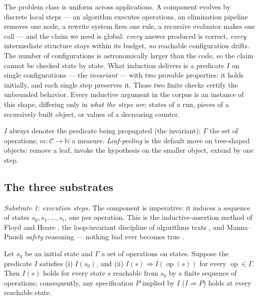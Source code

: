 The problem class is uniform across applications. A component evolves by discrete local
steps --- an algorithm executes operations, an elimination pipeline removes one node, a
rewrite system fires one rule, a recursive evaluator makes one call --- and the claim we
need is global: \emph{every} answer produced is correct, \emph{every} intermediate
structure stays within its budget, \emph{no} reachable configuration drifts. The number
of configurations is astronomically larger than the code, so the claim cannot be
checked state by state. What induction delivers is a predicate $I$ on single
configurations --- the \emph{invariant} --- with two provable properties: it holds
initially, and each single step preserves it. Those two finite checks certify the
unbounded behavior. Every inductive argument in the corpus is an instance of this
shape, differing only in \emph{what the steps are}: states of a run, pieces of a
recursively built object, or values of a decreasing counter.

\begin{remarkbox}[Notation]
$I$ always denotes the predicate being propagated (the invariant); $\Gamma$ the set of
operations; $m\colon\mathcal{C}\to\mathbb{N}$ a measure. \emph{Leaf-peeling} is the
default move on tree-shaped objects: remove a leaf, invoke the hypothesis on the
smaller object, extend by one step.
\end{remarkbox}

\subsection{The three substrates}
\label{sec:ind-ladder}

\emph{Substrate 1: execution steps.} The component is imperative: it induces a sequence
of states $s_0, s_1, \dots, s_t$, one per operation. This is the inductive-assertion
method of Floyd \citep{induction-bg1} and Hoare \citep{induction-bg2}, the
loop-invariant discipline of algorithms texts \citep{induction-bg4}, and Manna--Pnueli
\emph{safety} reasoning --- nothing bad ever becomes true \citep{induction-bg3}.

\begin{theorem}\label{thm:ind-invariant}
Let $s_0$ be an initial state and $\Gamma$ a set of operations on states. Suppose the
predicate $I$ satisfies (i) $I(s_0)$, and (ii) $I(s) \Rightarrow I(\operatorname{op}(s))$
for every $\operatorname{op} \in \Gamma$. Then $I(s)$ holds for every state $s$
reachable from $s_0$ by a finite sequence of operations; consequently, any
specification $P$ implied by $I$ ($I \Rightarrow P$) holds at every reachable state. \eop
\end{theorem}

